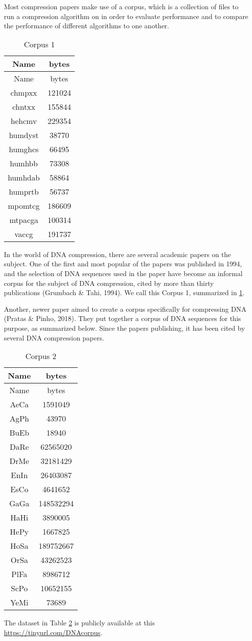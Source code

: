 \documentclass[12pt,twoside]{reedthesis}
\begin{document}
Most compression papers make use of a corpus, which is a collection of files to run a compression algorithm on in order to evaluate performance and to compare the performance of different algorithms to one another.
\begin{longtable}[]{@{}cc@{}}
\caption{\label{tab:corpus1filesfig}Corpus 1}\tabularnewline
\toprule()
Name & bytes \\
\midrule()
\endfirsthead
\toprule()
Name & bytes \\
\midrule()
\endhead
chmpxx & 121024 \\
chntxx & 155844 \\
hehcmv & 229354 \\
humdyst & 38770 \\
humghcs & 66495 \\
humhbb & 73308 \\
humhdab & 58864 \\
humprtb & 56737 \\
mpomtcg & 186609 \\
mtpacga & 100314 \\
vaccg & 191737 \\
\bottomrule()
\end{longtable}
In the world of DNA compression, there are several academic papers on the subject. One of the first and most popular of the papers was published in 1994, and the selection of DNA sequences used in the paper have become an informal corpus for the subject of DNA compression, cited by more than thirty publications (Grumbach \& Tahi, 1994). We call this Corpus 1, summarized in \ref{tab:corpus1filesfig}.

Another, newer paper aimed to create a corpus specifically for compressing DNA (Pratas \& Pinho, 2018). They put together a corpus of DNA sequences for this purpose, as summarized below. Since the papers publishing, it has been cited by several DNA compression papers.
\begin{longtable}[]{@{}cc@{}}
\caption{\label{tab:corpus2filesfig}Corpus 2}\tabularnewline
\toprule()
Name & bytes \\
\midrule()
\endfirsthead
\toprule()
Name & bytes \\
\midrule()
\endhead
AeCa & 1591049 \\
AgPh & 43970 \\
BuEb & 18940 \\
DaRe & 62565020 \\
DrMe & 32181429 \\
EnIn & 26403087 \\
EsCo & 4641652 \\
GaGa & 148532294 \\
HaHi & 3890005 \\
HePy & 1667825 \\
HoSa & 189752667 \\
OrSa & 43262523 \\
PlFa & 8986712 \\
ScPo & 10652155 \\
YeMi & 73689 \\
\bottomrule()
\end{longtable}
The dataset in Table \ref{tab:corpus2filesfig} is publicly available at this \url{https://tinyurl.com/DNAcorpus}.
\end{document}
